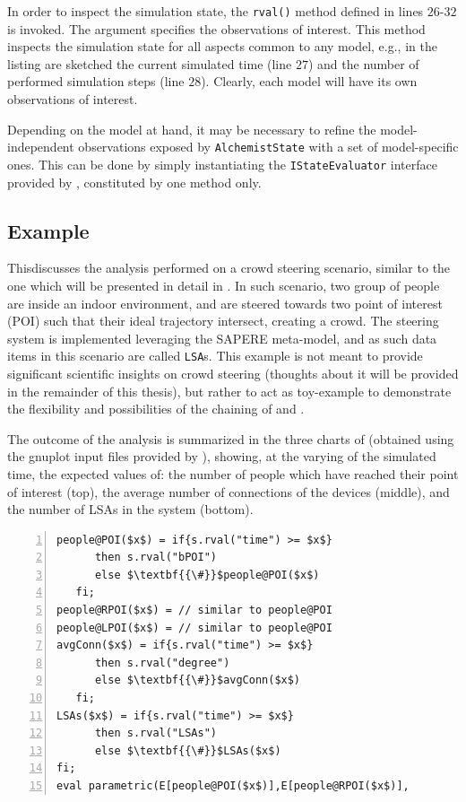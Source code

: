 \documentclass[12pt,a4paper,twoside,openright]{book}
\begin{document}
In order to inspect the simulation state, the \texttt{rval()} method defined in lines $26$-$32$ is invoked.
%
The argument specifies the observations of interest.
%
This method inspects the simulation state for all aspects common to any \alchemist{} model, e.g., in the listing are sketched the current simulated time (line $27$) and the number of performed simulation steps (line $28$).
%
Clearly, each \alchemist{} model will have its own observations of interest.

Depending on the model at hand, it may be necessary to refine the model-independent observations exposed by \texttt{AlchemistState} with a set of model-specific ones. This can be done by simply instantiating the \texttt{IStateEvaluator} interface provided by \multivesta, constituted by one method only.

\subsection{Example}

This\levelText{}discusses the analysis performed on a crowd steering scenario, similar to the one which will be presented in detail in .
%
In such scenario, two group of people are inside an indoor environment, and are steered towards two point of interest (POI) such that their ideal trajectory intersect, creating a crowd.
%
The steering system is implemented leveraging the SAPERE meta-model, and as such data items in this scenario are called \texttt{LSA}s.
%
This example is not meant to provide significant scientific insights on crowd steering (thoughts about it will be provided in the remainder of this thesis), but rather to act as toy-example to demonstrate the flexibility and possibilities of the chaining of \alchemist{} and \multivesta{}.

The outcome of the analysis is summarized in the three charts of  (obtained using the gnuplot input files provided by \multivesta{}), showing, at the varying of the simulated time, the expected values of: the number of people which have reached their point of interest (top), the average number of connections of the devices (middle), and the number of LSAs in the system (bottom).

\lstset{caption=The evaluated parametric multi-expression ($MainMQ$), label=listing:parametricMQ}
\begin{lstlisting}[frame=single, mathescape, morekeywords={parametric,eval,E,if,fi,then,else,s,rval,evalME,evalOnceME}, float=t, numbers=left]
people@POI($x$) = if{s.rval("time") >= $x$}
      then s.rval("bPOI")
      else $\textbf{{\#}}$people@POI($x$)
   fi;
people@RPOI($x$) = // similar to people@POI
people@LPOI($x$) = // similar to people@POI
avgConn($x$) = if{s.rval("time") >= $x$}
      then s.rval("degree")
      else $\textbf{{\#}}$avgConn($x$)
   fi;
LSAs($x$) = if{s.rval("time") >= $x$}
      then s.rval("LSAs") 
      else $\textbf{{\#}}$LSAs($x$)
fi;
eval parametric(E[people@POI($x$)],E[people@RPOI($x$)],              E[people@LPOI($x$)],E[avgConn($x$)],E[LSAs($x$)],$x$,$0.0$,$1.0$,$50.0$);
\end{lstlisting}
\end{document}
